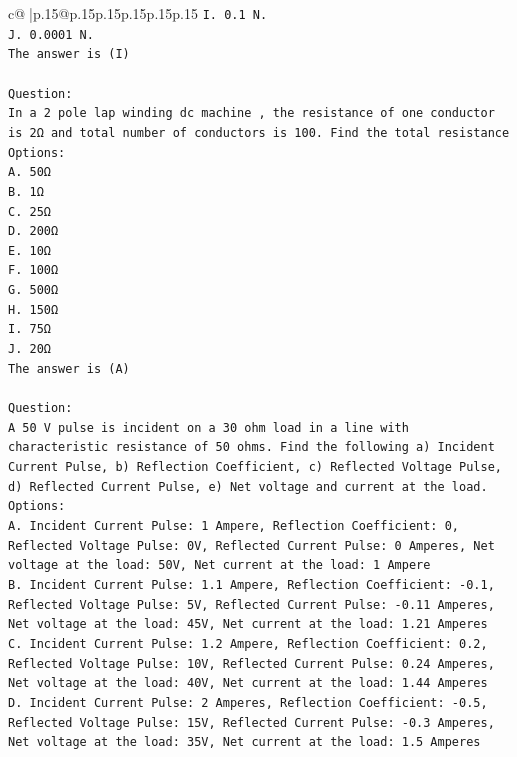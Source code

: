 \documentclass{article}
\begin{document}
{\begin{supertabular}{c@{$\;$}|p{.15\linewidth}@{}p{.15\linewidth}p{.15\linewidth}p{.15\linewidth}p{.15\linewidth}p{.15\linewidth}}
{{{\texttt{I. 0.1 N.} \\
\texttt{J. 0.0001 N.} \\
\texttt{The answer is (I)} \\
\\ 
\texttt{Question:} \\
\texttt{In a 2 pole lap winding dc machine , the resistance of one conductor is 2Ω and total number of conductors is 100. Find the total resistance} \\
\texttt{Options:} \\
\texttt{A. 50Ω} \\
\texttt{B. 1Ω} \\
\texttt{C. 25Ω} \\
\texttt{D. 200Ω} \\
\texttt{E. 10Ω} \\
\texttt{F. 100Ω} \\
\texttt{G. 500Ω} \\
\texttt{H. 150Ω} \\
\texttt{I. 75Ω} \\
\texttt{J. 20Ω} \\
\texttt{The answer is (A)} \\
\\ 
\texttt{Question:} \\
\texttt{A 50 V pulse is incident on a 30 ohm load in a line with characteristic resistance of 50 ohms. Find the following a) Incident Current Pulse, b) Reflection Coefficient, c) Reflected Voltage Pulse, d) Reflected Current Pulse, e) Net voltage and current at the load.} \\
\texttt{Options:} \\
\texttt{A. Incident Current Pulse: 1 Ampere, Reflection Coefficient: 0, Reflected Voltage Pulse: 0V, Reflected Current Pulse: 0 Amperes, Net voltage at the load: 50V, Net current at the load: 1 Ampere} \\
\texttt{B. Incident Current Pulse: 1.1 Ampere, Reflection Coefficient: {-}0.1, Reflected Voltage Pulse: 5V, Reflected Current Pulse: {-}0.11 Amperes, Net voltage at the load: 45V, Net current at the load: 1.21 Amperes} \\
\texttt{C. Incident Current Pulse: 1.2 Ampere, Reflection Coefficient: 0.2, Reflected Voltage Pulse: 10V, Reflected Current Pulse: 0.24 Amperes, Net voltage at the load: 40V, Net current at the load: 1.44 Amperes} \\
\texttt{D. Incident Current Pulse: 2 Amperes, Reflection Coefficient: {-}0.5, Reflected Voltage Pulse: 15V, Reflected Current Pulse: {-}0.3 Amperes, Net voltage at the load: 35V, Net current at the load: 1.5 Amperes} \\
}}}
\end{supertabular}}
\end{document}

